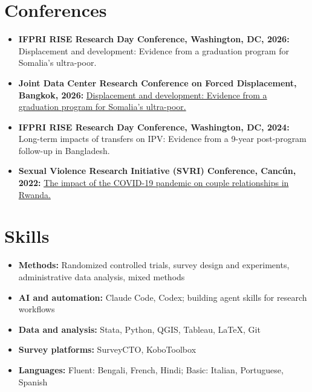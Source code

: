\documentclass[a4paper,11pt]{article}
\newcommand{\cvline}[2]{\item \textbf{#1} #2}
\newcommand{\linesstart}{\begin{itemize}[leftmargin=*,labelsep=1mm,itemsep=0.8mm,topsep=1mm]}
\newcommand{\linesend}{\end{itemize}}
\begin{document}
\section{Conferences}
\linesstart
 \cvline{IFPRI RISE Research Day Conference, Washington, DC, 2026:}{Displacement and development: Evidence from a graduation program for Somalia’s ultra-poor.}
  \cvline{Joint Data Center Research Conference on Forced Displacement, Bangkok, 2026:}{\href{https://www.jointdatacenter.org/news-and-events/4th-research-conference-on-forced-displacement/}{Displacement and development: Evidence from a graduation program for Somalia’s ultra-poor.}}
  \cvline{IFPRI RISE Research Day Conference, Washington, DC, 2024:}{Long-term impacts of transfers on IPV: Evidence from a 9-year post-program follow-up in Bangladesh.}
  \cvline{Sexual Violence Research Initiative (SVRI) Conference, Cancún, 2022:}{\href{https://www.svriforum2022.org/conference-programme/}{The impact of the COVID-19 pandemic on couple relationships in Rwanda.}}
\linesend

\section{Skills}
\linesstart
  \cvline{Methods:}{Randomized controlled trials, survey design and experiments, administrative data analysis, mixed methods}
  \cvline{AI and automation:}{Claude Code, Codex; building agent skills for research workflows}
  \cvline{Data and analysis:}{Stata, Python, QGIS, Tableau, \LaTeX{}, Git}
  \cvline{Survey platforms:}{SurveyCTO, KoboToolbox}
  \cvline{Languages:}{Fluent: Bengali, French, Hindi; Basic: Italian, Portuguese, Spanish}
\linesend
\end{document}
